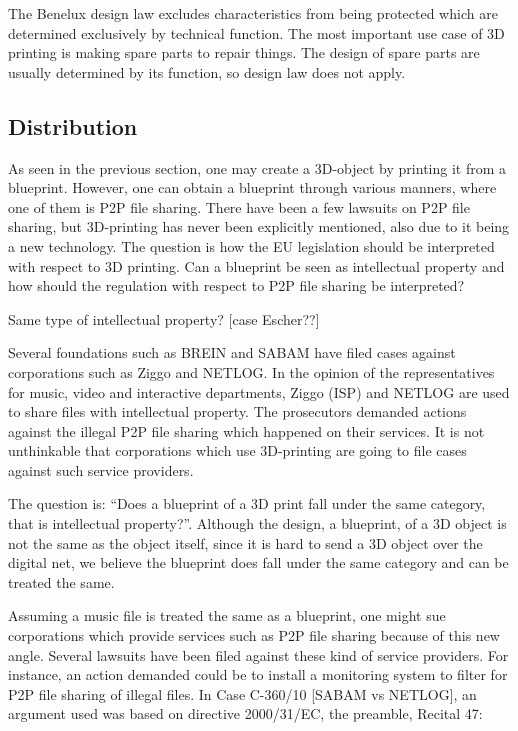 The Benelux design law excludes characteristics from being protected which are determined exclusively by technical function.
The most important use case of 3D printing is making spare parts to repair things.
The design of spare parts are usually determined by its function, so design law does not apply.

\subsection{Distribution}

As seen in the previous section, one may create a 3D-object by printing it from a blueprint. However, one can obtain a blueprint through various manners, where one of them is P2P file sharing. There have been a few lawsuits on P2P file sharing, but 3D-printing has never been explicitly mentioned, also due to it being a new technology. The question is how the EU legislation should be interpreted with respect to 3D printing. Can a blueprint be seen as intellectual property and how should the regulation with respect to P2P file sharing be interpreted?

Same type of intellectual property?
[case Escher??]

Several foundations such as BREIN and SABAM have filed cases against corporations such as Ziggo and NETLOG. In the opinion of the representatives for music, video and interactive departments, Ziggo (ISP) and NETLOG are used to share files with intellectual property. The prosecutors demanded actions against the illegal P2P file sharing which happened on their services. It is not unthinkable that corporations which use 3D-printing are going to file cases against such service providers.

The question is: “Does a blueprint of a 3D print fall under the same category, that is intellectual property?”. Although the design, a blueprint, of a 3D object is not the same as the object itself, since it is hard to send a 3D object over the digital net, we believe the blueprint does fall under the same category and can be treated the same.

Assuming a music file is treated the same as a blueprint, one might sue corporations which provide services such as P2P file sharing because of this new angle. Several lawsuits have been filed against these kind of service providers. For instance, an action demanded could be to install a monitoring system to filter for P2P file sharing of illegal files. In Case C-360/10 [SABAM vs NETLOG], an argument used was based on directive 2000/31/EC, the preamble, Recital 47: 

